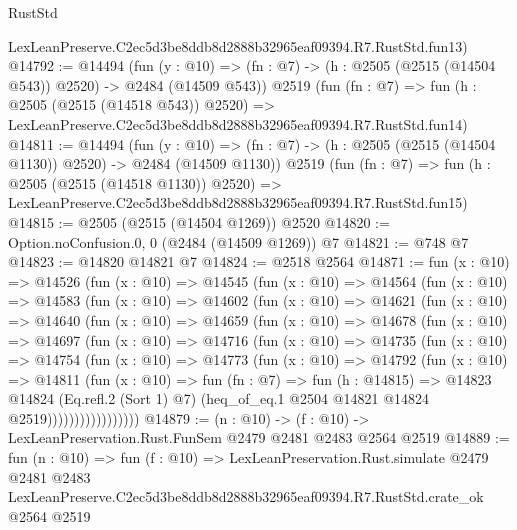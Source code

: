 \begin{lexlean}{RustStd}
\begin{coremodule}
    LexLeanPreserve.C2ec5d3be8ddb8d2888b32965eaf09394.R7.RustStd.fun13)
@14792 := @14494
    (fun (y : @10) => (fn : @7) -> (h : @2505 (@2515 (@14504 @543)) @2520) -> @2484 (@14509 @543))
    @2519
    (fun (fn : @7) =>
    fun (h : @2505 (@2515 (@14518 @543)) @2520) =>
    LexLeanPreserve.C2ec5d3be8ddb8d2888b32965eaf09394.R7.RustStd.fun14)
@14811 := @14494
    (fun (y : @10) => (fn : @7) -> (h : @2505 (@2515 (@14504 @1130)) @2520) -> @2484 (@14509 @1130))
    @2519
    (fun (fn : @7) =>
    fun (h : @2505 (@2515 (@14518 @1130)) @2520) =>
    LexLeanPreserve.C2ec5d3be8ddb8d2888b32965eaf09394.R7.RustStd.fun15)
@14815 := @2505 (@2515 (@14504 @1269)) @2520
@14820 := Option.noConfusion.{0, 0} (@2484 (@14509 @1269)) @7
@14821 := @748 @7
@14823 := @14820 @14821 @7
@14824 := @2518 @2564
@14871 := fun (x : @10) =>
  @14526
    (fun (x : @10) =>
    @14545
      (fun (x : @10) =>
      @14564
        (fun (x : @10) =>
        @14583
          (fun (x : @10) =>
          @14602
            (fun (x : @10) =>
            @14621
              (fun (x : @10) =>
              @14640
                (fun (x : @10) =>
                @14659
                  (fun (x : @10) =>
                  @14678
                    (fun (x : @10) =>
                    @14697
                      (fun (x : @10) =>
                      @14716
                        (fun (x : @10) =>
                        @14735
                          (fun (x : @10) =>
                          @14754
                            (fun (x : @10) =>
                            @14773
                              (fun (x : @10) =>
                              @14792
                                (fun (x : @10) =>
                                @14811
                                  (fun (x : @10) =>
                                  fun (fn : @7) =>
                                  fun (h : @14815) =>
                                  @14823
                                    @14824
                                    (Eq.refl.{2} (Sort 1) @7)
                                    (heq_of_eq.{1} @2504 @14821 @14824 @2519)))))))))))))))))
@14879 := (n : @10) -> (f : @10) -> LexLeanPreservation.Rust.FunSem @2479 @2481 @2483 @2564 @2519
@14889 := fun (n : @10) =>
  fun (f : @10) =>
  LexLeanPreservation.Rust.simulate
    @2479
    @2481
    @2483
    LexLeanPreserve.C2ec5d3be8ddb8d2888b32965eaf09394.R7.RustStd.crate_ok
    @2564
    @2519
\end{coremodule}
\end{lexlean}

